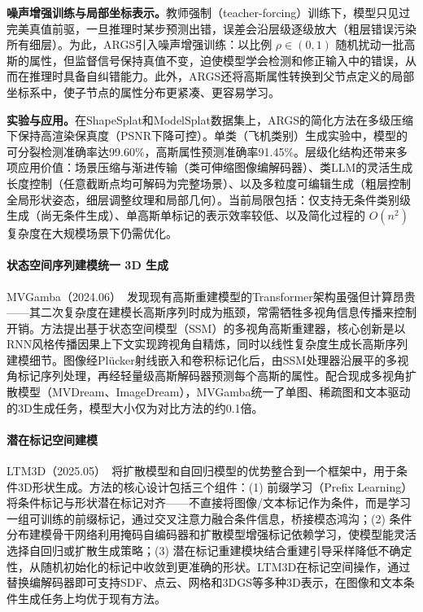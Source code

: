 \textbf{噪声增强训练与局部坐标表示。}教师强制（teacher-forcing）训练下，模型只见过完美真值前驱，一旦推理时某步预测出错，误差会沿层级逐级放大（粗层错误污染所有细层）。为此，ARGS引入噪声增强训练：以比例 $\rho \in (0,1)$ 随机扰动一批高斯的属性，但监督信号保持真值不变，迫使模型学会检测和修正输入中的错误，从而在推理时具备自纠错能力。此外，ARGS还将高斯属性转换到父节点定义的局部坐标系中，使子节点的属性分布更紧凑、更容易学习。

\textbf{实验与应用。}在ShapeSplat和ModelSplat数据集上，ARGS的简化方法在多级压缩下保持高渲染保真度（PSNR下降可控）。单类（飞机类别）生成实验中，模型的可分裂检测准确率达99.60\%，高斯属性预测准确率91.45\%。层级化结构还带来多项应用价值：场景压缩与渐进传输（类可伸缩图像编解码器）、类LLM的灵活生成长度控制（任意截断点均可解码为完整场景）、以及多粒度可编辑生成（粗层控制全局形状姿态，细层调整纹理和局部几何）。当前局限包括：仅支持无条件类别级生成（尚无条件生成）、单高斯单标记的表示效率较低、以及简化过程的 $O(n^2)$ 复杂度在大规模场景下仍需优化。

\paragraph{状态空间序列建模统一 3D 生成}

MVGamba（2024.06）~\cite{2406_06367}发现现有高斯重建模型的Transformer架构虽强但计算昂贵——其二次复杂度在建模长高斯序列时成为瓶颈，常需牺牲多视角信息传播来控制开销。方法提出基于状态空间模型（SSM）的多视角高斯重建器，核心创新是以RNN风格传播因果上下文实现跨视角自精炼，同时以线性复杂度生成长高斯序列建模细节。图像经Pl\"ucker射线嵌入和卷积标记化后，由SSM处理器沿展平的多视角标记序列处理，再经轻量级高斯解码器预测每个高斯的属性。配合现成多视角扩散模型（MVDream、ImageDream），MVGamba统一了单图、稀疏图和文本驱动的3D生成任务，模型大小仅为对比方法的约0.1倍。

\paragraph{潜在标记空间建模}

LTM3D（2025.05）~\cite{2505_24245}将扩散模型和自回归模型的优势整合到一个框架中，用于条件3D形状生成。方法的核心设计包括三个组件：(1) 前缀学习（Prefix Learning）将条件标记与形状潜在标记对齐——不直接将图像/文本标记作为条件，而是学习一组可训练的前缀标记，通过交叉注意力融合条件信息，桥接模态鸿沟；(2) 条件分布建模骨干网络利用掩码自编码器和扩散模型增强标记依赖学习，使模型能灵活选择自回归或扩散生成策略；(3) 潜在标记重建模块结合重建引导采样降低不确定性，从随机初始化的标记中收敛到更准确的形状。LTM3D在标记空间操作，通过替换编解码器即可支持SDF、点云、网格和3DGS等多种3D表示，在图像和文本条件生成任务上均优于现有方法。

